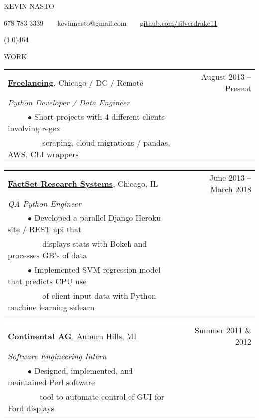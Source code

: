 \documentclass[11pt]{article}
\begin{document}
{\LARGE KEVIN NASTO}

678-78\vphantom{x}3-3339~~\textbullet~~kevin\vphantom{x}nast\vphantom{x}o@g\vphantom{x}mail.com~~\textbullet~~\href{https://github.com/silverdrake11/kevinnasto-cv/blob/master/resume.tex}{github.com/silverdrake11}

\line(1,0){464}
\vspace{.8cm}


{WORK}
\vspace{0.4cm}

\begin{tabularx}{\linewidth}{l X r}
\textbf{\href{https://www.upwork.com/o/profiles/users/_~0146e5e5e6eefb0f2a/}{Freelancing}}, Chicago / DC / Remote & & August 2013 -- Present \\
\emph{Python Developer / Data Engineer} \\
~~~~~$\bullet$ Short projects with 4 different clients involving regex \\
~~~~~~~~ scraping, cloud migrations / pandas, AWS, CLI wrappers\\
\end{tabularx}

\vspace{0.4cm}

\begin{tabularx}{\linewidth}{l X r}
\textbf{\href{https://www.factset.com/}{FactSet Research Systems}}, Chicago, IL & & June 2013 -- March 2018 \\
\emph{QA Python Engineer} \\
~~~~~$\bullet$ Developed a parallel Django Heroku site / REST api that\\
~~~~~~~~ displays stats with Bokeh and processes GB's of data \\
~~~~~$\bullet$ Implemented SVM regression model that predicts CPU use \\
~~~~~~~~ of client input data with Python machine learning sklearn\\
\end{tabularx}

\vspace{0.4cm}

\begin{tabularx}{\linewidth}{l X r}
\textbf{\href{https://www.continental-corporation.com/en}{Continental AG}}, Auburn Hills, MI & & Summer 2011 \& 2012 \\
\emph{Software Engineering Intern} \\
~~~~~$\bullet$ Designed, implemented, and maintained Perl software \\
~~~~~~~~tool to automate control of GUI for Ford displays\\
\end{tabularx}
\end{document}
